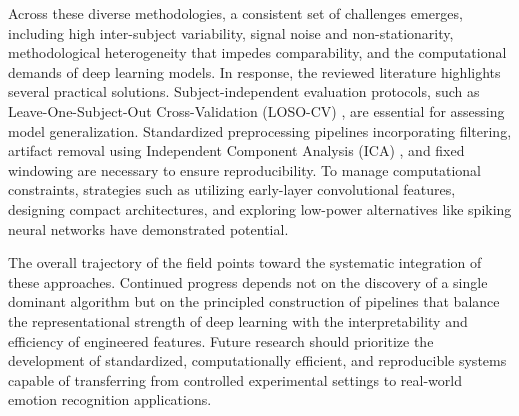\documentclass[conference]{IEEEtran}
\begin{document}
Across these diverse methodologies, a consistent set of challenges emerges, including high inter-subject variability, signal noise and non-stationarity, methodological heterogeneity that impedes comparability, and the computational demands of deep learning models. In response, the reviewed literature highlights several practical solutions. Subject-independent evaluation protocols, such as Leave-One-Subject-Out Cross-Validation (LOSO-CV) \cite{Bagherzadeh2023HybridEEGWaveletCNN_SVM}, are essential for assessing model generalization. Standardized preprocessing pipelines incorporating filtering, artifact removal using Independent Component Analysis (ICA) \cite{Lee2020MFB_CNN_PilotMentalStates}, and fixed windowing are necessary to ensure reproducibility. To manage computational constraints, strategies such as utilizing early-layer convolutional features, designing compact architectures, and exploring low-power alternatives like spiking neural networks have demonstrated potential.

The overall trajectory of the field points toward the systematic integration of these approaches. Continued progress depends not on the discovery of a single dominant algorithm but on the principled construction of pipelines that balance the representational strength of deep learning with the interpretability and efficiency of engineered features. Future research should prioritize the development of standardized, computationally efficient, and reproducible systems capable of transferring from controlled experimental settings to real-world emotion recognition applications.




\end{document}
